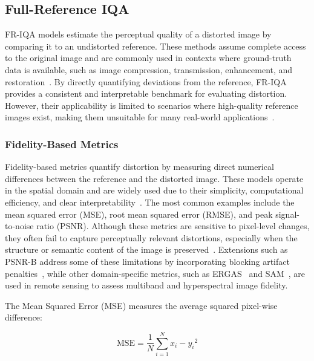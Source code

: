 \subsection{Full-Reference IQA}\label{sec:full_reference_iqa}

FR-IQA models estimate the perceptual quality of a distorted image by comparing it to an undistorted reference. These methods assume complete access to the original image and are commonly used in contexts where ground-truth data is available, such as image compression, transmission, enhancement, and restoration~\cite{sheikh2006image, wang2004image}. By directly quantifying deviations from the reference, FR-IQA provides a consistent and interpretable benchmark for evaluating distortion. However, their applicability is limited to scenarios where high-quality reference images exist, making them unsuitable for many real-world applications~\cite{mittal2012making, hosu2020koniq}.


\subsubsection{Fidelity-Based Metrics}\label{sec:error_based_metrics}

Fidelity-based metrics quantify distortion by measuring direct numerical differences between the reference and the distorted image. These models operate in the spatial domain and are widely used due to their simplicity, computational efficiency, and clear interpretability~\cite{gonzalez2002digital, wang2009mean}. The most common examples include the mean squared error (MSE), root mean squared error (RMSE), and peak signal-to-noise ratio (PSNR). Although these metrics are sensitive to pixel-level changes, they often fail to capture perceptually relevant distortions, especially when the structure or semantic content of the image is preserved~\cite{wang2004image, chandler2007vsnr}. Extensions such as PSNR-B address some of these limitations by incorporating blocking artifact penalties~\cite{yim2011psnrb}, while other domain-specific metrics, such as ERGAS~\cite{ranchin2000ergas} and SAM~\cite{kruse1993sam}, are used in remote sensing to assess multiband and hyperspectral image fidelity.

The Mean Squared Error (MSE) measures the average squared pixel-wise difference:

\begin{equation}
\text{MSE} = \frac{1}{N} \sum_{i=1}^{N} {x_i - y_i}^2
\end{equation}

